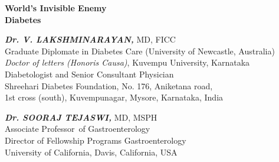 \thispagestyle{empty}

\begin{center}
\Huge\textbf{World’s Invisible Enemy\\ Diabetes}
\end{center}

\vskip 150pt


\begin{center}
{\large\textbf{\textit{Dr. V. LAKSHMINARAYAN,}} MD, FICC\\{\small Graduate Diplomate in Diabetes Care (University of Newcastle, Australia)\\\textit{Doctor of letters (Honoris Causa)}, Kuvempu University, Karnataka\\ Diabetologist and Senior Consultant Physician\\ Shreehari Diabetes Foundation, No. 176, Aniketana road,\\ 1st cross (south), Kuvempunagar, Mysore, Karnataka, India}}
\end{center}

\vskip 30pt

\begin{center}
{\large\textbf{\textit{Dr. SOORAJ TEJASWI,}} MD, MSPH\\{\small Associate Professor of Gastroenterology\\Director of Fellowship Programs Gastroenterology\\ University of California, Davis, California, USA}}
\end{center}
